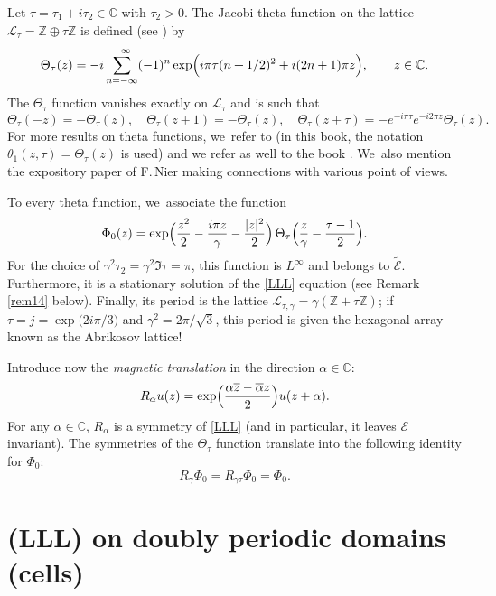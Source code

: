 \documentclass[10pt]{amsart}
\theoremstyle{definition}
\let\EE\exp
\let\ov\overline
\newcommand\C{\mathbb C}
\begin{document}
Let $\tau=\tau_1+i \tau_2 \in \C$ with $\tau_2>0$. The Jacobi theta function on the lattice $ \mathcal{L}_\tau = \mathbb{Z}\oplus \tau \mathbb{Z}$ is defined (see \cite[Chap.\,V]{Cha}) by
\begin{equation*}
\Theta_{\tau}(z)=-i \sum_{n=-\infty}^{+\infty} (-1)^n \EE\Bigl({i\pi \tau (n+1/2)^2}+{i(2n+1)\pi z}\Bigr), \qquad z\in \C.
\end{equation*}
The $\Theta_{\tau}$ function vanishes exactly on $\mathcal{L}_\tau$ and is such that
\begin{equation}\label{star}
\Theta_{\tau}(-z)=-\Theta_{\tau}(z),\quad \Theta_{\tau}(z+1)=-\Theta_{\tau}(z),\quad \Theta_{\tau}(z+\tau)=-e^{-i \pi \tau}e^{-i 2\pi z}\Theta_{\tau}(z).
\end{equation}
For more results on theta functions, we~refer to \cite[\S 4]{Godement} (in this book, the notation $\theta_1(z, \tau)=\Theta_{\tau}(z)$ is used) and we refer as well to the book \cite{Mumford}. We~also mention the expository paper \cite{Nier2} of F.\,Nier making connections with various point of views.

To every theta function, we~associate the function
\[
\Phi_0(z) = \EE\Bigl(\frac{z^2}2 - \frac{{i \pi}z} {\gamma} - \frac{|z|^2}2\Bigr) \,\Theta_\tau \Bigl(\frac{z}{\gamma} - \frac{\tau-1}{2} \Bigr).
\]
For the choice of $\gamma^2 \tau_2 = \gamma^2 \Im \tau= \pi$, this function is $L^\infty$ and belongs to $\widetilde {\mathcal E}$. Furthermore, it is a stationary solution of the \eqref{LLL} equation (see Remark \ref{rem14} below). Finally, its period is the lattice $\mathcal{L}_{\tau,\gamma}=\gamma (\mathbb{Z} + \tau \mathbb{Z})$;
if $\tau = j = \EE\bigl({{2i \pi}/{3}}\bigr)$ and $\gamma^2 = {2\pi}/{\sqrt{3}}$, this period is given the hexagonal array known as the Abrikosov lattice!

Introduce now the \textit{magnetic translation} in the direction $\alpha \in \mathbb{C}$:
\[
R_\alpha u (z) = \EE\Bigl(\frac{\alpha \ov{z} - \ov{\alpha} z}2\Bigr) u(z+\alpha).
\]
For any $\alpha\in \C$, $R_\alpha$ is a symmetry of \eqref{LLL} (and in particular, it leaves $\mathcal{E}$ invariant). The symmetries of the $\Theta_{\tau}$ function translate into the following identity for $\Phi_0$:
\begin{equation}
\label{symPhi}
R_{\gamma} \Phi_0 = R_{\gamma \tau} \Phi_0 = \Phi_0.
\end{equation}

\section{(LLL) on doubly periodic domains (cells)}
\label{section2}
\end{document}
